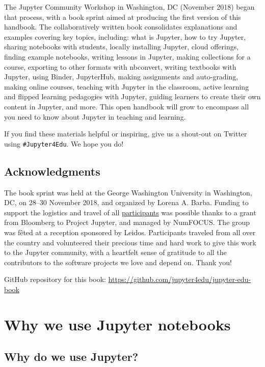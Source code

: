 \documentclass[]{book}
\begin{document}
The Jupyter Community Workshop in Washington, DC (November 2018) began
that process, with a book sprint aimed at producing the first version of
this handbook. The collaboratively written book consolidates
explanations and examples covering key topics, including: what is
Jupyter, how to try Jupyter, sharing notebooks with students, locally
installing Jupyter, cloud offerings, finding example notebooks, writing
lessons in Jupyter, making collections for a course, exporting to other
formats with nbconvert, writing textbooks with Jupyter, using Binder,
JupyterHub, making assignments and auto-grading, making online courses,
teaching with Jupyter in the classroom, active learning and flipped
learning pedagogies with Jupyter, guiding learners to create their own
content in Jupyter, and more. This open handbook will grow to encompass
all you need to know about Jupyter in teaching and learning.

If you find these materials helpful or inspiring, give us a shout-out on
Twitter using \texttt{\#Jupyter4Edu}. We hope you do!

\section*{Acknowledgments}\label{acknowledgments}

The book sprint was held at the George Washington University in
Washington, DC, on 28--30 November 2018, and organized by Lorena A.
Barba. Funding to support the logistics and travel of all
\protect\hyperlink{authors}{participants} was possible thanks to a grant
from Bloomberg to Project Jupyter, and managed by NumFOCUS. The group
was fêted at a reception sponsored by Leidos. Participants traveled from
all over the country and volunteered their precious time and hard work
to give this work to the Jupyter community, with a heartfelt sense of
gratitude to all the contributors to the software projects we love and
depend on. Thank you!

GitHub repository for this book:
\url{https://github.com/jupyter4edu/jupyter-edu-book}

\chapter{Why we use Jupyter
notebooks}\label{why-we-use-jupyter-notebooks}

\section{Why do we use Jupyter?}\label{why-do-we-use-jupyter}
\end{document}
